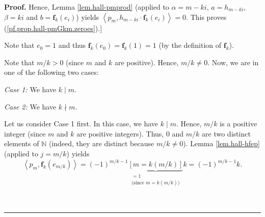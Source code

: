 \documentclass[numbers=enddot,12pt,final,onecolumn,notitlepage]{scrartcl}%
\theoremstyle{definition}
\newenvironment{proof}[1][Proof]{\noindent\textbf{#1.} }{\ \rule{0.5em}{0.5em}}
\begin{document}
\begin{proof}
Hence, Lemma \ref{lem.hall-pmprod} (applied to $\alpha=m-ki$, $a=h_{m-ki}$,
$\beta=ki$ and $b=\mathbf{f}_{k}\left(  e_{i}\right)  $) yields $\left\langle
p_{m},h_{m-ki}\cdot\mathbf{f}_{k}\left(  e_{i}\right)  \right\rangle =0$. This
proves (\ref{pf.prop.hall-pmGkm.zeroes}).]

Note that $e_{0}=1$ and thus $\mathbf{f}_{k}\left(  e_{0}\right)
=\mathbf{f}_{k}\left(  1\right)  =1$ (by the definition of $\mathbf{f}_{k}$).

Note that $m/k>0$ (since $m$ and $k$ are positive). Hence, $m/k\neq0$. Now, we
are in one of the following two cases:

\textit{Case 1:} We have $k\mid m$.

\textit{Case 2:} We have $k\nmid m$.

Let us consider Case 1 first. In this case, we have $k\mid m$. Hence, $m/k$ is
a positive integer (since $m$ and $k$ are positive integers). Thus, $0$ and
$m/k$ are two distinct elements of $\mathbb{N}$ (indeed, they are distinct
because $m/k\neq0$). Lemma \ref{lem.hall-hfep} (applied to $j=m/k$) yields%
\[
\left\langle p_{m},\mathbf{f}_{k}\left(  e_{m/k}\right)  \right\rangle
=\left(  -1\right)  ^{m/k-1}\underbrace{\left[  m=k\left(  m/k\right)
\right]  }_{\substack{=1\\\text{(since }m=k\left(  m/k\right)  \text{)}%
}}k=\left(  -1\right)  ^{m/k-1}k.
\]



\end{proof}
\end{document}
